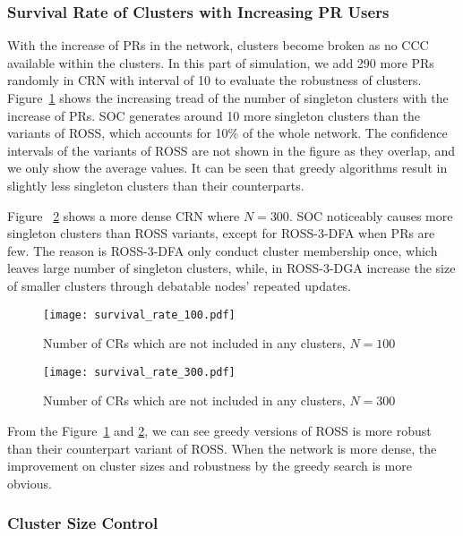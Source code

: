 \subsubsection{Survival Rate of Clusters with Increasing PR Users}
With the increase of PRs in the network, clusters become broken as no CCC available within the clusters.
In this part of simulation, we add 290 more PRs randomly in CRN with interval of 10 to evaluate the robustness of clusters.
Figure~\ref{singleton_clusters_100} shows the increasing tread of the number of singleton clusters with the increase of PRs.
SOC generates around 10 more singleton clusters than the variants of ROSS, which accounts for 10\% of the whole network.
The confidence intervals of the variants of ROSS are not shown in the figure as they overlap, and we only show the average values.
It can be seen that greedy algorithms result in slightly less singleton clusters than their counterparts.

Figure ~\ref{singleton_clusters_300} shows a more dense CRN where $N=300$.
SOC noticeably causes more singleton clusters than ROSS variants, except for ROSS-3-DFA when PRs are few.
The reason is ROSS-3-DFA only conduct cluster membership once, which leaves large number of singleton clusters, while, in ROSS-3-DGA increase the size of smaller clusters through debatable nodes' repeated updates.

\begin{figure}[h!]
  \centering
  \texttt{[image: survival\_rate\_100.pdf]}
  \caption{Number of CRs which are not included in any clusters, $N=100$}
  \label{singleton_clusters_100}
\end{figure}

\begin{figure}[h!]
  \centering
   \texttt{[image: survival\_rate\_300.pdf]}
  \caption{Number of CRs which are not included in any clusters, $N=300$}
  \label{singleton_clusters_300}
\end{figure}

From the Figure~\ref{singleton_clusters_100} and \ref{singleton_clusters_300}, we can see greedy versions of ROSS is more robust than their counterpart variant of ROSS.
When the network is more dense, the improvement on cluster sizes and robustness by the greedy search is more obvious.


\subsubsection{Cluster Size Control}

